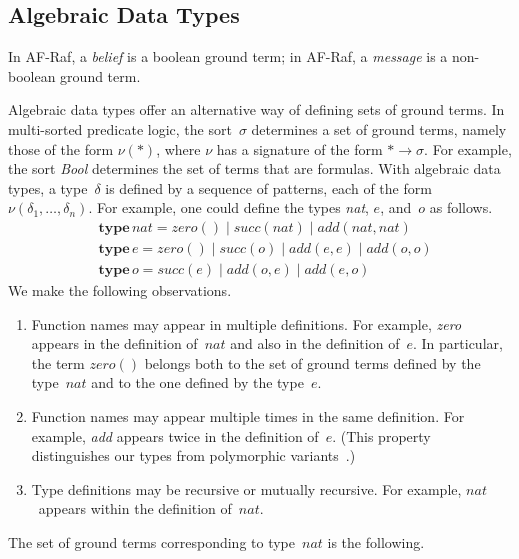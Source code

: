 \documentclass[a4paper,12pt,oneside,fleqn]{book} %
\newcommand{\rg}[1]{\marginpar{\tiny\raggedright\textcolor{blue}{\bf rg:} #1}}
\renewcommand{\rg}{}
\begin{document}
{\subsection{Algebraic Data Types} %

In AF-Raf, a \emph{belief} is a boolean ground term; in AF-Raf, a
\emph{message} is a non-boolean ground term.

Algebraic data types offer an alternative way of defining sets of ground
terms. In multi-sorted predicate logic, the sort~$\sigma$ determines a set
of ground terms, namely those of the form $\nu(*)$, where $\nu$ has a
signature of the form $*\to\sigma$.  For example, the sort \textit{Bool}
determines the set of terms that are formulas.  With algebraic data types,
a type~$\delta$ is defined by a sequence of patterns, each of the form
$\nu(\delta_1,\ldots,\delta_n)$. For example, one could define the types
\textit{nat}, $e$, and~$o$ as follows.
\begin{align}
&\mathbf{type}\,\mathit{nat} =
      \mathit{zero}()
  \mid\mathit{succ}(\mathit{nat})
  \mid\mathit{add}(\mathit{nat},\mathit{nat}) \\
&\mathbf{type}\,e =
      \mathit{zero}()
  \mid\mathit{succ}(o)
  \mid\mathit{add}(e,e)
  \mid\mathit{add}(o,o) \\
&\mathbf{type}\,o =
      \mathit{succ}(e)
  \mid\mathit{add}(o,e)
  \mid\mathit{add}(e,o)
\end{align}
We make the following observations.
\begin{enumerate}
\item
  Function names may appear in multiple definitions. For example,
  \textit{zero} appears in the definition of~$\mathit{nat}$ and also in the
  definition of~$e$. In particular, the term $\mathit{zero}()$ belongs both
  to the set of ground terms defined by the type~$\mathit{nat}$ and to the
  one defined by the type~$e$.
\item
  Function names may appear multiple times in the same definition. For
  example, \textit{add} appears twice in the definition of~$e$. (This
  property distinguishes our types from polymorphic
  variants~\cite{garrigue1998}.)
\item
  Type definitions may be recursive or mutually recursive. For example,
  $\mathit{nat}$~appears within the definition of~$\mathit{nat}$.
\end{enumerate}
The set of ground terms corresponding to type~$\mathit{nat}$ is the following.
}
\end{document}
